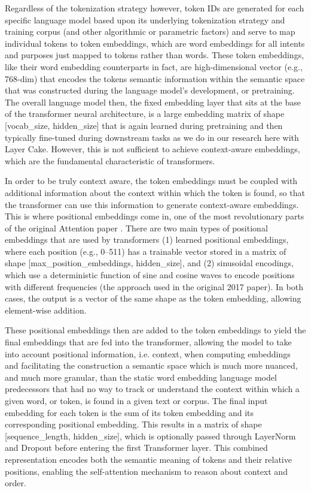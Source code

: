 \documentclass[final]{clv2025}
\begin{document}
Regardless of the tokenization strategy however, token IDs are generated for each specific language model based upon its underlying tokenization strategy and training corpus (and other algorithmic or parametric factors) and serve to map individual tokens to token embeddings, which are word embeddings for all intents and purposes just mapped to tokens rather than words. These token embeddings, like their word embedding counterparts in fact, are high-dimensional vector (e.g., 768-dim) that encodes the tokens semantic information within the semantic space that was constructed during the language model’s development, or pretraining. The overall language model then, the fixed embedding layer that sits at the base of the transformer neural architecture, is a large embedding matrix of shape [vocab\_size, hidden\_size] that is again learned during pretraining and then typically fine-tuned during downstream tasks as we do in our research here with Layer Cake. However, this is not sufficient to achieve context-aware embeddings, which are the fundamental characteristic of transformers. 

In order to be truly context aware, the token embeddings must be coupled with additional information about the context within which the token is found, so that the transformer can use this information to generate context-aware embeddings. This is where positional embeddings come in, one of the most revolutionary parts of the original Attention paper \cite{vaswani}. There are two main types of positional embeddings that are used by transformers (1) learned positional embeddings, where each position (e.g., 0–511) has a trainable vector stored in a matrix of shape [max\_position\_embeddings, hidden\_size], and (2) sinusoidal encodings, which use a deterministic function of sine and cosine waves to encode positions with different frequencies (the approach used in the original 2017 paper). In both cases, the output is a vector of the same shape as the token embedding, allowing element-wise addition.

These positional embeddings then are added to the token embeddings to yield the final embeddings that are fed into the transformer, allowing the model to take into account positional information, i.e. context, when computing embeddings and facilitating the construction a semantic space which is much more nuanced, and much more granular, than the static word embedding language model predecessors that had no way to track or understand the context within which a given word, or token, is found in a given text or corpus. The final input embedding for each token is the sum of its token embedding and its corresponding positional embedding. This results in a matrix of shape [sequence\_length, hidden\_size], which is optionally passed through LayerNorm and Dropout before entering the first Transformer layer. This combined representation encodes both the semantic meaning of tokens and their relative positions, enabling the self-attention mechanism to reason about context and order.
\end{document}
